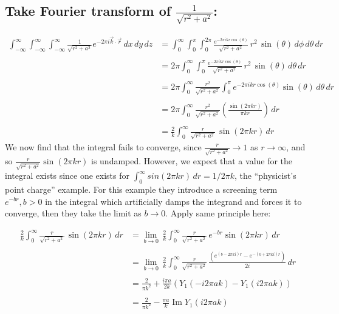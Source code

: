 \documentclass[letterpaper,10pt]{article}
\begin{document}
\subsection*{Take Fourier transform of $\frac{1}{\sqrt{r^2+a^2}}$:}
\begin{align*}
\int_{-\infty}^\infty\int_{-\infty}^\infty\int_{-\infty}^\infty \frac{1}{\sqrt{r^2+a^2}}e^{-2 \pi i\vec k\cdot \vec r }\,dx\,dy\,dz&=
\int_0^\infty\int_0^\pi \int_0^{2\pi} \frac{e^{-2 \pi ikr\cos(\theta)}}{\sqrt{r^2+a^2}}\,r^2\,\sin(\theta)\,d\phi\,d\theta\,dr\\\\
&=2\pi \int_0^\infty \int_0^\pi \frac{e^{-2 \pi ikr\cos(\theta)}}{\sqrt{r^2+a^2}}\,r^2\,\sin(\theta)\,d\theta\,dr\\\\
&=2\pi \int_0^\infty \frac{r^2}{\sqrt{r^2+a^2}} \int_0^\pi  e^{-2 \pi ikr\cos(\theta)}\sin(\theta)\,d\theta\,dr\,\\\\
&=2\pi \int_0^\infty \frac{r^2}{\sqrt{r^2+a^2}}\left(\frac{\sin(2\pi kr)}{\pi k r}\right)\,dr\\\\
&=\frac{2}{k} \int_0^\infty \frac{r}{\sqrt{r^2+a^2}}\,\sin(2\pi kr)\,dr
\end{align*}
We now find that the integral fails to converge, since $\frac{r}{\sqrt{r^2+a^2}} \to 1$ as $r \to \infty$, and so $\frac{r}{\sqrt{r^2+a^2}} \sin(2\pi kr)$ is undamped. However, we expect that a value for the integral exists since one exists for $\int_0^\infty sin(2 \pi kr) \,dr = 1/2 \pi k $, the ``physicist's point charge'' example. For this example they introduce a screening term $e^{-br}, b>0$ in the integral which artificially damps the integrand and forces it to converge, then they take the limit as $b\rightarrow 0$. Apply same principle here:

\begin{align*}
\frac{2}{k} \int_0^\infty \frac{r}{\sqrt{r^2+a^2}}\,\sin(2\pi kr)\,dr &= \lim_{b \to 0}\, \frac{2}{k} \int_0^\infty \frac{r}{\sqrt{r^2+a^2}}\,e^{-b r}\sin(2\pi kr)\,dr\\\\
&= \lim_{b \to 0}\, \frac{2}{k} \int_0^\infty \frac{r}{\sqrt{r^2+a^2}}\, \frac{( e^{(b - 2 \pi k i)r} - e^{-(b + 2 \pi k i)r})}{2 i}\, dr\\\\
&= \frac{2}{\pi k^2} + \frac{i \pi a}{2k} (Y_1(-i 2 \pi a k)-Y_1(i 2 \pi a k))\\\\
&= \frac{2}{\pi k^2} - \frac{\pi a}{k} \operatorname{Im}Y_1(i 2 \pi a k)
\end{align*}
\end{document}

